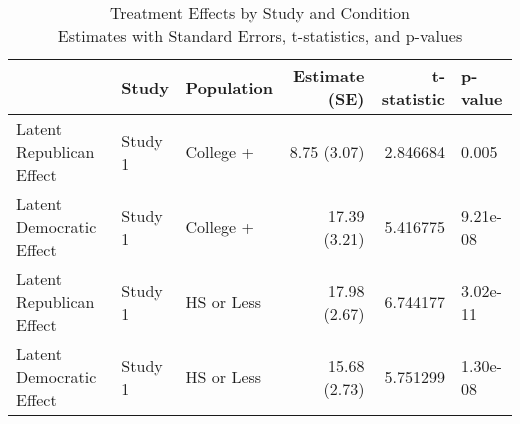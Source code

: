 \begin{table}[!t]
\caption*{
{\large Treatment Effects by Study and Condition} \\ 
{\small Estimates with Standard Errors, t-statistics, and p-values}
} 
\fontsize{12.0pt}{14.4pt}\selectfont
\begin{tabular*}{\linewidth}{@{\extracolsep{\fill}}l|llrrl}
\toprule
 & Study & Population & Estimate (SE) & t-statistic & p-value \\ 
\midrule\addlinespace[2.5pt]
Latent Republican Effect & Study 1 & College + & 8.75 (3.07) & 2.846684 & 0.005 \\ 
Latent Democratic Effect & Study 1 & College + & 17.39 (3.21) & 5.416775 & 9.21e-08 \\ 
Latent Republican Effect & Study 1 & HS or Less & 17.98 (2.67) & 6.744177 & 3.02e-11 \\ 
Latent Democratic Effect & Study 1 & HS or Less & 15.68 (2.73) & 5.751299 & 1.30e-08 \\ 
\bottomrule
\end{tabular*}
\end{table}

